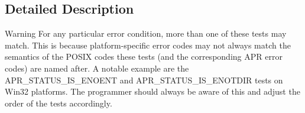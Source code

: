 \subsection{Detailed Description}
\begin{DoxyWarning}{Warning}
For any particular error condition, more than one of these tests may match. This is because platform-\/specific error codes may not always match the semantics of the P\-O\-S\-I\-X codes these tests (and the corresponding A\-P\-R error codes) are named after. A notable example are the A\-P\-R\-\_\-\-S\-T\-A\-T\-U\-S\-\_\-\-I\-S\-\_\-\-E\-N\-O\-E\-N\-T and A\-P\-R\-\_\-\-S\-T\-A\-T\-U\-S\-\_\-\-I\-S\-\_\-\-E\-N\-O\-T\-D\-I\-R tests on Win32 platforms. The programmer should always be aware of this and adjust the order of the tests accordingly. 
\end{DoxyWarning}


